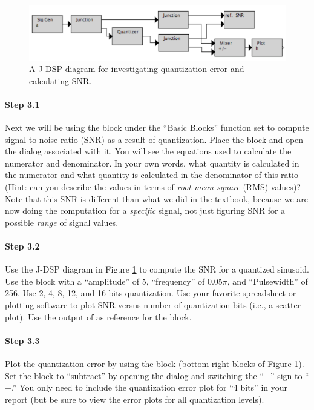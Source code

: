 	\begin{figure}[h]
	  \begin{center}
	    \includegraphics[width=5.0in]{lab3/block_diagram_step3}
	  \end{center}
	\caption{ A J-DSP diagram for investigating quantization error and calculating SNR. 
	\label{fg:step3}}
	\end{figure}

\paragraph{Step 3.1} Next we will be using the  block under the ``Basic Blocks'' 
	function set to compute signal-to-noise ratio (SNR) as a result of quantization. Place the 
	 block and open the dialog associated with it. You will see the equations used to 
	calculate the numerator and denominator. In your own words, what quantity is calculated in the 
	numerator and what quantity is calculated in the denominator of this ratio (Hint: can you 
	describe the values in terms of \emph{root mean square} (RMS) values)? Note that this SNR is 
	different than what we did in the textbook, because we are now doing the computation for a 
	\textit{specific} signal, not just figuring SNR for a possible \textit{range} of signal values.
	

\paragraph{Step 3.2} Use the J-DSP diagram in Figure \ref{fg:step3} to compute the SNR for a 
	quantized sinusoid. Use the  block with a ``amplitude'' of 5, ``frequency'' of 0.05$
	\pi$, and ``Pulsewidth'' of 256. Use 2, 4, 8, 12, and 16 bits quantization. Use your favorite 
	spreadsheet or plotting software to plot SNR versus number of quantization bits (i.e., a scatter 
	plot). Use the output of  as reference for the  block. 

\paragraph{Step 3.3} Plot the quantization error by using the  block (bottom right 
	blocks of Figure \ref{fg:step3}). Set the  block to ``subtract'' by opening the dialog 
	and switching the ``$+$'' sign to ``$-$.'' You only need to include the quantization error plot for 
	``4 bits'' in your report (but be sure to view the error plots for all quantization levels).

